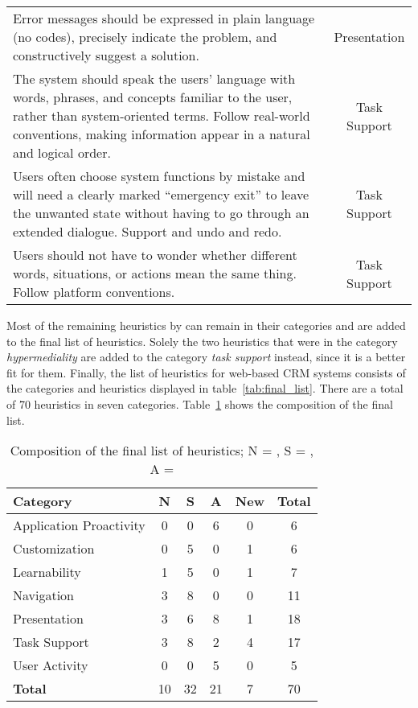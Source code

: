 \begin{table}[htbp]
\begin{tabularx}{\textwidth}{Xc}
		Error messages should be expressed in plain language (no codes), precisely indicate the problem, and constructively suggest a solution. & Presentation \\
		The system should speak the users' language with words, phrases, and concepts familiar to the user, rather than system-oriented terms. Follow real-world conventions, making information appear in a natural and logical order. & Task Support \\
		Users often choose system functions by mistake and will need a clearly marked ``emergency exit'' to leave the unwanted state without having to go through an extended dialogue. Support and undo and redo. & Task Support \\
		Users should not have to wonder whether different words, situations, or actions mean the same thing. Follow platform conventions. & Task Support \\
		\bottomrule
	\end{tabularx}
\end{table}

\FloatBarrier
Most of the remaining heuristics by \citet{Ardito2006} can remain in their categories and are added to the final list of heuristics. Solely the two heuristics that were in the category \textit{hypermediality} are added to the category \textit{task support} instead, since it is a better fit for them. Finally, the list of heuristics for web-based CRM systems consists of the categories and heuristics displayed in table~\ref{tab:final_list}. There are a total of 70 heuristics in seven categories. Table~\ref{tab:final_list_composition} shows the composition of the final list.

\begin{table}[htbp]
	\centering
	\vspace{0.5cm}
	\caption[Composition of the final list of heuristics]{Composition of the final list of heuristics; N = \citet{Nielsen1994a}, S = \citet{Singh2009}, A = \citet{Ardito2006}}
	\label{tab:final_list_composition}
	\begin{tabular}{lcccc|c} \toprule
		\textbf{Category} & \textbf{N} & \textbf{S} & \textbf{A} & \textbf{New} & \textbf{Total} \\ \midrule
		Application Proactivity	&  0 &  0 &  6 & 0 &  6 \\
		Customization 			&  0 &  5 &  0 & 1 &  6 \\
		Learnability 			&  1 &  5 &  0 & 1 &  7 \\
		Navigation 				&  3 &  8 &  0 & 0 & 11 \\
		Presentation 			&  3 &  6 &  8 & 1 & 18 \\
		Task Support 			&  3 &  8 &  2 & 4 & 17 \\
		User Activity 			&  0 &  0 &  5 & 0 &  5 \\ \midrule
		\textbf{Total} 			& 10 & 32 & 21 & 7 & 70 \\
		\bottomrule
	\end{tabular}
\end{table}

